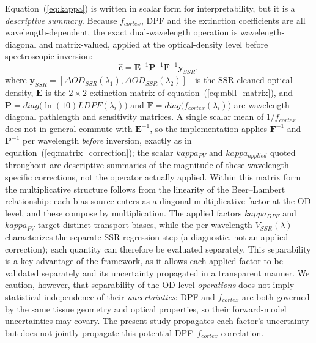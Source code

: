\documentclass[11pt]{article}
\def\kappa{kappa}%
\def\mathrm#1{#1}%
\def\,{ }%
\begin{document}
Equation~(\ref{eq:kappa}) is written in scalar form for interpretability, but it is a \emph{descriptive summary}. Because $f_{\mathrm{cortex}}$, DPF and the extinction coefficients are all wavelength-dependent, the exact dual-wavelength operation is wavelength-diagonal and matrix-valued, applied at the optical-density level before spectroscopic inversion:
\begin{equation}
\widehat{\mathbf{c}} = \mathbf{E}^{-1}\,\mathbf{P}^{-1}\,\mathbf{F}^{-1}\,\mathbf{y}_{\mathrm{SSR}},
\label{eq:matrix_correction}
\end{equation}
where $\mathbf{y}_{\mathrm{SSR}} = [\Delta\mathrm{OD}_{\mathrm{SSR}}(\lambda_1),\,\Delta\mathrm{OD}_{\mathrm{SSR}}(\lambda_2)]^{\top}$ is the SSR-cleaned optical density, $\mathbf{E}$ is the $2\times2$ extinction matrix of equation~(\ref{eq:mbll_matrix}), and $\mathbf{P} = \mathrm{diag}\!\big(\ln(10)\,L\,\mathrm{DPF}(\lambda_i)\big)$ and $\mathbf{F} = \mathrm{diag}\!\big(f_{\mathrm{cortex}}(\lambda_i)\big)$ are wavelength-diagonal pathlength and sensitivity matrices. A single scalar mean of $1/f_{\mathrm{cortex}}$ does not in general commute with $\mathbf{E}^{-1}$, so the implementation applies $\mathbf{F}^{-1}$ and $\mathbf{P}^{-1}$ per wavelength \emph{before} inversion, exactly as in equation~(\ref{eq:matrix_correction}); the scalar $\kappa_{\mathrm{PV}}$ and $\kappa_{\mathrm{applied}}$ quoted throughout are descriptive summaries of the magnitude of these wavelength-specific corrections, not the operator actually applied. Within this matrix form the multiplicative structure follows from the linearity of the Beer--Lambert relationship: each bias source enters as a diagonal multiplicative factor at the OD level, and these compose by multiplication. The applied factors $\kappa_{\mathrm{DPF}}$ and $\kappa_{\mathrm{PV}}$ target distinct transport biases, while the per-wavelength $V_{\mathrm{SSR}}(\lambda)$ characterizes the separate SSR regression step (a diagnostic, not an applied correction); each quantity can therefore be evaluated separately. This separability is a key advantage of the framework, as it allows each applied factor to be validated separately and its uncertainty propagated in a transparent manner. We caution, however, that separability of the OD-level \emph{operations} does not imply statistical independence of their \emph{uncertainties}: DPF and $f_{\mathrm{cortex}}$ are both governed by the same tissue geometry and optical properties, so their forward-model uncertainties may covary. The present study propagates each factor's uncertainty but does not jointly propagate this potential DPF--$f_{\mathrm{cortex}}$ correlation.
\end{document}
